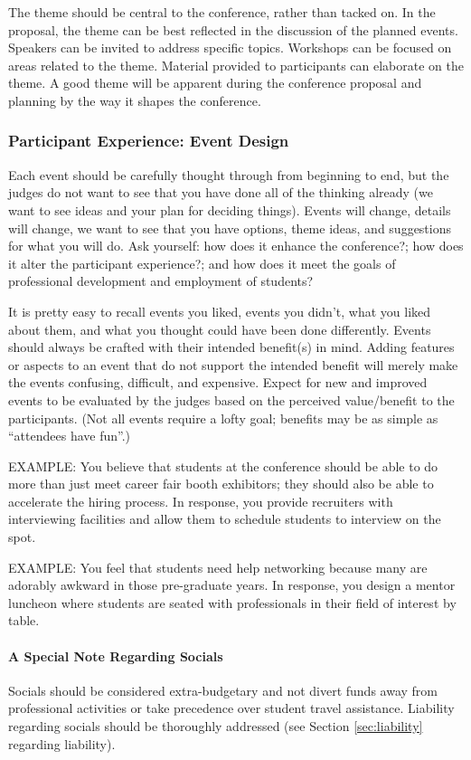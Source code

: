 \documentclass[12pt]{article}
\begin{document}
The theme should be central to the conference, rather than tacked on. In the proposal, the theme can be best reflected in the discussion of the planned events. Speakers can
be invited to address specific topics. Workshops can be focused on areas related to the
theme. Material provided to participants can elaborate on the theme. A good theme will be apparent during the conference proposal and planning by the way it shapes the conference.

\subsubsection{Participant Experience: Event Design}
Each event should be carefully thought through from beginning to end, but the judges do not want to see that you have done all of the thinking already (we want to see ideas and your plan for deciding things). Events will change, details will change, we want to see that you have options, theme ideas, and suggestions for what you will do. Ask yourself: how does it enhance the conference?; how does it alter the participant experience?; and how does it meet the goals of professional development and employment of students?

It is pretty easy to recall events you liked, events you didn’t, what you liked about them, and what you thought could have been done differently. Events should always be crafted with their intended benefit(s) in mind. Adding features or aspects to an event that do not support the intended benefit will merely make the events confusing, difficult, and expensive. Expect for new and improved events to be evaluated by the judges based on the perceived value/benefit to the participants. (Not all events require a lofty goal; benefits may be as simple as “attendees have fun”.)

EXAMPLE: You believe that students at the conference should be able to do more than just meet career fair booth exhibitors; they should also be able to accelerate the hiring process. In response, you provide recruiters with interviewing facilities and allow them to schedule students to interview on the spot.

EXAMPLE: You feel that students need help networking because many are adorably awkward in those pre-graduate years. In response, you design a mentor luncheon where students are seated with professionals in their field of interest by table.

\paragraph{A Special Note Regarding Socials}
Socials should be considered extra-budgetary and not divert funds away from professional activities or take precedence over student travel assistance. Liability regarding socials should be thoroughly addressed (see Section \ref{sec:liability} regarding liability).
\end{document}
